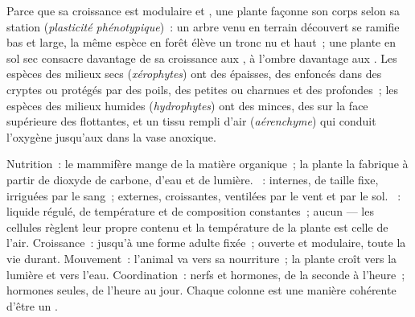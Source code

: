 \begin{proposition}\label{prop:b1:flowering-plant-organization:plasticity}
Parce que sa croissance est modulaire et , une plante façonne
son corps selon sa station (\emph{plasticité
phénotypique})~: un arbre venu en terrain
découvert se ramifie bas et large, la même espèce en forêt élève un
tronc nu et haut~; une plante en sol sec consacre davantage de sa
croissance aux , à l'ombre davantage aux . Les espèces
des milieux secs (\emph{xérophytes}) ont des 
épaisses, des  enfoncés dans des cryptes ou protégés par des
poils, des  petites ou charnues et des  profondes~; les
espèces des milieux humides (\emph{hydrophytes}) ont
des  minces, des  sur la face supérieure des 
flottantes, et un tissu rempli d'air
(\emph{aérenchyme}) qui conduit l'oxygène jusqu'aux
 dans la vase anoxique.
\end{proposition}

\begin{example}\label{ex:b1:flowering-plant-organization:comparison}
Nutrition~: le mammifère mange de la matière organique~; la plante la
fabrique à partir de dioxyde de carbone, d'eau et de lumière. ~: internes, de taille fixe, irriguées par le sang~; externes,
croissantes, ventilées par le vent et par le sol. ~:
liquide régulé, de température et de composition constantes~; aucun ---
les cellules règlent leur propre contenu et la température de la plante
est celle de l'air. Croissance~: jusqu'à une forme adulte fixée~;
ouverte et modulaire, toute la vie durant. Mouvement~: l'animal va vers
sa nourriture~; la plante croît vers la lumière et vers l'eau.
Coordination~: nerfs et hormones, de la seconde à l'heure~; hormones
seules, de l'heure au jour. Chaque colonne est une manière cohérente
d'être un .
\end{example}

